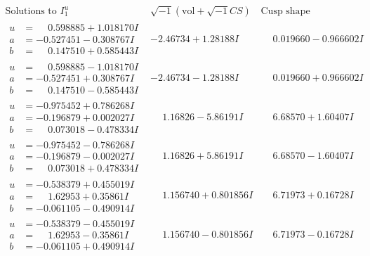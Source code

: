 \documentclass[1p]{elsarticle_modified}
\theoremstyle{definition}
\newcommand{\I}{\sqrt{-1}}
\begin{document}
$$\begin{array}{c|c|c}  
\text{Solutions to }I^u_{1}& \I (\text{vol} + \sqrt{-1}CS) & \text{Cusp shape}\\
 \hline 
\begin{aligned}
u &= \phantom{-}0.598885 + 1.018170 I \\
a &= -0.527451 - 0.308767 I \\
b &= \phantom{-}0.147510 + 0.585443 I\end{aligned}
 & -2.46734 + 1.28188 I & \phantom{-}0.019660 - 0.966602 I \\ \hline\begin{aligned}
u &= \phantom{-}0.598885 - 1.018170 I \\
a &= -0.527451 + 0.308767 I \\
b &= \phantom{-}0.147510 - 0.585443 I\end{aligned}
 & -2.46734 - 1.28188 I & \phantom{-}0.019660 + 0.966602 I \\ \hline\begin{aligned}
u &= -0.975452 + 0.786268 I \\
a &= -0.196879 + 0.002027 I \\
b &= \phantom{-}0.073018 - 0.478334 I\end{aligned}
 & \phantom{-}1.16826 - 5.86191 I & \phantom{-}6.68570 + 1.60407 I \\ \hline\begin{aligned}
u &= -0.975452 - 0.786268 I \\
a &= -0.196879 - 0.002027 I \\
b &= \phantom{-}0.073018 + 0.478334 I\end{aligned}
 & \phantom{-}1.16826 + 5.86191 I & \phantom{-}6.68570 - 1.60407 I \\ \hline\begin{aligned}
u &= -0.538379 + 0.455019 I \\
a &= \phantom{-}1.62953 + 0.35861 I \\
b &= -0.061105 - 0.490914 I\end{aligned}
 & \phantom{-}1.156740 + 0.801856 I & \phantom{-}6.71973 + 0.16728 I \\ \hline\begin{aligned}
u &= -0.538379 - 0.455019 I \\
a &= \phantom{-}1.62953 - 0.35861 I \\
b &= -0.061105 + 0.490914 I\end{aligned}
 & \phantom{-}1.156740 - 0.801856 I & \phantom{-}6.71973 - 0.16728 I \\ \hline\begin{aligned}

\end{aligned}
\end{array}$$
\end{document}
